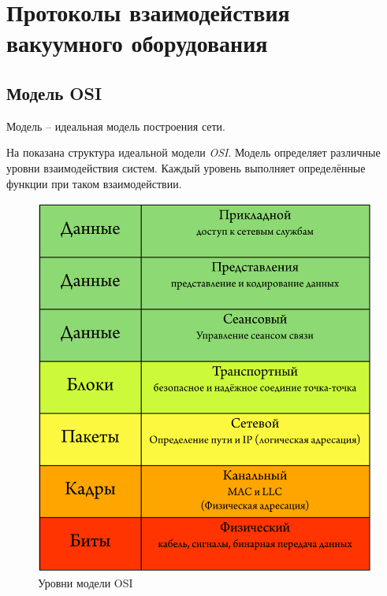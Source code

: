 \documentclass[../AISTR.tex]{subfiles}
\begin{document}
\section{Протоколы взаимодействия вакуумного оборудования}
\subsection{Модель OSI}
Модель \osi{} -- идеальная модель построения сети.

На  показана структура идеальной модели \textit{OSI}. Модель определяет различные уровни взаимодействия систем. Каждый уровень выполняет определённые функции при таком взаимодействии.


\begin{figure}[H]
	\centering
	\includegraphics[width=0.6\linewidth]{../images/osi}
	\caption{Уровни модели OSI}
	\label{fig:osi}
\end{figure}
\end{document}
